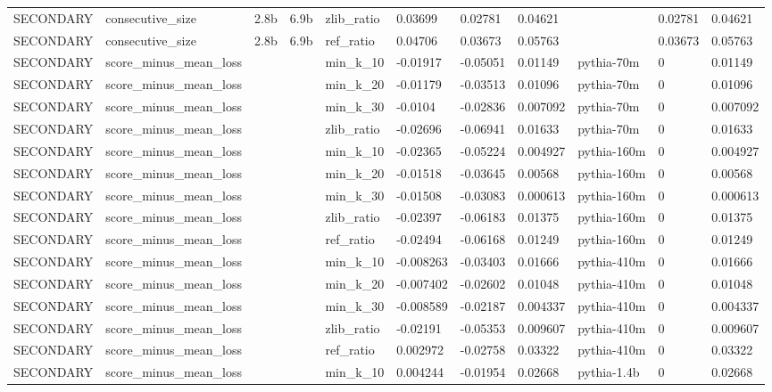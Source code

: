 \begin{tabular}{lllllllllll}
SECONDARY & consecutive\_size & 2.8b & 6.9b & zlib\_ratio & 0.03699 & 0.02781 & 0.04621 &  & 0.02781 & 0.04621 \\
SECONDARY & consecutive\_size & 2.8b & 6.9b & ref\_ratio & 0.04706 & 0.03673 & 0.05763 &  & 0.03673 & 0.05763 \\
SECONDARY & score\_minus\_mean\_loss &  &  & min\_k\_10 & -0.01917 & -0.05051 & 0.01149 & pythia-70m & 0 & 0.01149 \\
SECONDARY & score\_minus\_mean\_loss &  &  & min\_k\_20 & -0.01179 & -0.03513 & 0.01096 & pythia-70m & 0 & 0.01096 \\
SECONDARY & score\_minus\_mean\_loss &  &  & min\_k\_30 & -0.0104 & -0.02836 & 0.007092 & pythia-70m & 0 & 0.007092 \\
SECONDARY & score\_minus\_mean\_loss &  &  & zlib\_ratio & -0.02696 & -0.06941 & 0.01633 & pythia-70m & 0 & 0.01633 \\
SECONDARY & score\_minus\_mean\_loss &  &  & min\_k\_10 & -0.02365 & -0.05224 & 0.004927 & pythia-160m & 0 & 0.004927 \\
SECONDARY & score\_minus\_mean\_loss &  &  & min\_k\_20 & -0.01518 & -0.03645 & 0.00568 & pythia-160m & 0 & 0.00568 \\
SECONDARY & score\_minus\_mean\_loss &  &  & min\_k\_30 & -0.01508 & -0.03083 & 0.000613 & pythia-160m & 0 & 0.000613 \\
SECONDARY & score\_minus\_mean\_loss &  &  & zlib\_ratio & -0.02397 & -0.06183 & 0.01375 & pythia-160m & 0 & 0.01375 \\
SECONDARY & score\_minus\_mean\_loss &  &  & ref\_ratio & -0.02494 & -0.06168 & 0.01249 & pythia-160m & 0 & 0.01249 \\
SECONDARY & score\_minus\_mean\_loss &  &  & min\_k\_10 & -0.008263 & -0.03403 & 0.01666 & pythia-410m & 0 & 0.01666 \\
SECONDARY & score\_minus\_mean\_loss &  &  & min\_k\_20 & -0.007402 & -0.02602 & 0.01048 & pythia-410m & 0 & 0.01048 \\
SECONDARY & score\_minus\_mean\_loss &  &  & min\_k\_30 & -0.008589 & -0.02187 & 0.004337 & pythia-410m & 0 & 0.004337 \\
SECONDARY & score\_minus\_mean\_loss &  &  & zlib\_ratio & -0.02191 & -0.05353 & 0.009607 & pythia-410m & 0 & 0.009607 \\
SECONDARY & score\_minus\_mean\_loss &  &  & ref\_ratio & 0.002972 & -0.02758 & 0.03322 & pythia-410m & 0 & 0.03322 \\
SECONDARY & score\_minus\_mean\_loss &  &  & min\_k\_10 & 0.004244 & -0.01954 & 0.02668 & pythia-1.4b & 0 & 0.02668 \\

\end{tabular}
